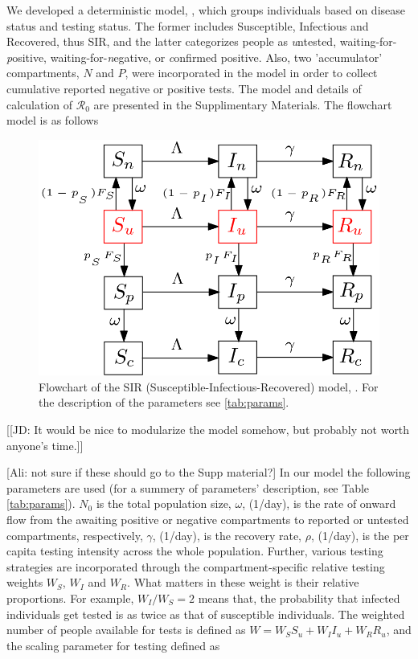 \documentclass[12pt]{article}
\newcommand{\Rnum}{\mathcal{R}_0}
\theoremstyle{definition} %
\begin{document}
We developed a deterministic model, , which groups individuals based on disease status and testing status. The former includes Susceptible, Infectious and Recovered, thus SIR, and the latter categorizes people as \emph untested, waiting-for-\emph positive, waiting-for-\emph negative, or \emph confirmed positive. Also, two 'accumulator' compartments, $N$ and $P$, were incorporated in the model in order to collect cumulative reported negative or positive tests. The model and details of calculation of $\Rnum$ are presented in the Supplimentary Materials. The flowchart model is as follows 

\begin{figure}[!h] 
\begin{center} 
\includegraphics[scale=0.3]{./pix/sir_comp.png}
\caption{\small Flowchart of the SIR (Susceptible-Infectious-Recovered) model, . For the description of the parameters see \cref{tab:params}.
\label{fig:flowchart}}
\end{center} 
\end{figure}

[[JD: It would be nice to modularize the model somehow, but probably not worth anyone's time.]]

[Ali: not sure if these should go to the Supp material?] In our model the following parameters are used (for a summery of parameters' description, see Table \ref{tab:params}). $N_0$ is the total population size, $\omega$, (1/day), is the rate of onward flow from the awaiting positive or negative compartments to reported or untested compartments, respectively, $\gamma$, (1/day), is the recovery rate, $\rho$, (1/day), is the per capita testing intensity across the whole population. Further, various testing strategies are incorporated through the compartment-specific relative testing weights $W_S$, $W_I$ and $W_R$. What matters in these weight is their relative proportions. For example, $W_I/W_S=2$ means that, the probability that infected individuals get tested is as twice as that of susceptible individuals. The weighted number of people available for tests is defined as $W = W_S S_u + W_I I_u + W_R R_u$, and the scaling parameter for testing defined as
\end{document}
